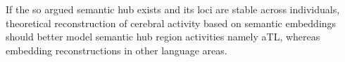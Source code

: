 If the so argued semantic hub exists and its loci are stable across individuals, theoretical reconstruction of cerebral activity based on semantic \similarity embeddings should better model semantic hub region activities namely aTL, whereas \association embedding reconstructions in other language areas.



